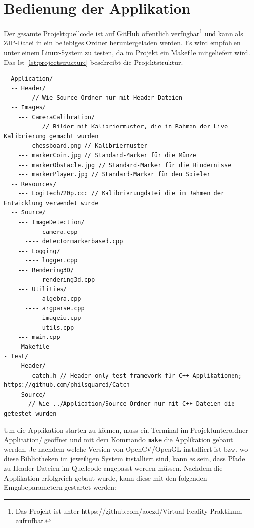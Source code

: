
\section{Bedienung der Applikation}\label{sec:BedienungApplikation}
Der gesamte Projektquellcode ist auf GitHub öffentlich verfügbar\footnote{Das Projekt ist unter https://github.com/aoezd/Virtual-Reality-Praktikum aufrufbar.} und kann als ZIP-Datei in ein beliebiges Ordner heruntergeladen werden. Es wird empfohlen unter einem Linux-System zu testen, da im Projekt ein Makefile mitgeliefert wird. Das \acs{lst} \ref{lst:projectstructure} beschreibt die Projektstruktur.

\begin{lstlisting}[caption={Die Beschreibung der allgemeinen Projektstruktur}, label={lst:projectstructure}]
- Application/
  -- Header/
    --- // Wie Source-Ordner nur mit Header-Dateien
  -- Images/
    --- CameraCalibration/
      ---- // Bilder mit Kalibriermuster, die im Rahmen der Live-Kalibrierung gemacht wurden
    --- chessboard.png // Kalibriermuster
    --- markerCoin.jpg // Standard-Marker für die Münze
    --- markerObstacle.jpg // Standard-Marker für die Hindernisse
    --- markerPlayer.jpg // Standard-Marker für den Spieler
  -- Resources/
    --- Logitech720p.ccc // Kalibrierungdatei die im Rahmen der Entwicklung verwendet wurde
  -- Source/
    --- ImageDetection/
      ---- camera.cpp
      ---- detectormarkerbased.cpp
    --- Logging/
      ---- logger.cpp
    --- Rendering3D/
      ---- rendering3d.cpp
    --- Utilities/
      ---- algebra.cpp
      ---- argparse.cpp
      ---- imageio.cpp
      ---- utils.cpp
    --- main.cpp
  -- Makefile
- Test/
  -- Header/
    --- catch.h // Header-only test framework für C++ Applikationen; https://github.com/philsquared/Catch
  -- Source/
    -- // Wie ../Application/Source-Ordner nur mit C++-Dateien die getestet wurden
\end{lstlisting}

\noindent Um die Applikation starten zu können, muss ein Terminal im Projektunterordner \glqq Application/\grqq{} geöffnet und mit dem Kommando \glqq \texttt{make}\grqq{} die Applikation gebaut werden. Je nachdem welche Version von OpenCV/OpenGL installiert ist bzw. wo diese Bibliotheken im jeweiligen System installiert sind, kann es sein, dass Pfade zu Header-Dateien im Quellcode angepasst werden müssen. Nachdem die Applikation erfolgreich gebaut wurde, kann diese mit den folgenden Eingabeparametern gestartet werden:

